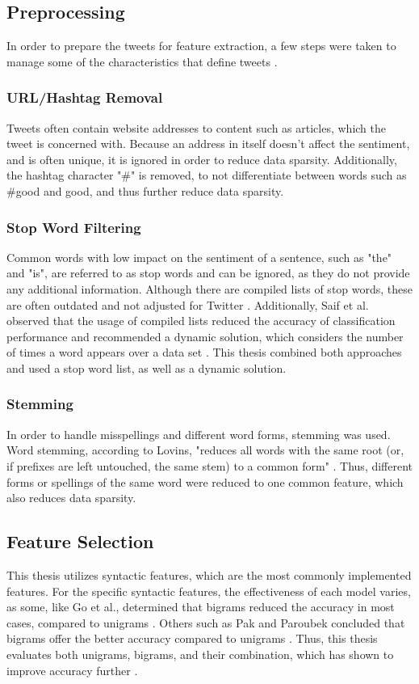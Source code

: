 \subsection{Preprocessing}
In order to prepare the tweets for feature extraction, a few steps were taken to manage some of the characteristics that define tweets \cite{DBLP:journals/csur/GiachanouC16}.

\subsubsection{URL/Hashtag Removal}
Tweets often contain website addresses to content such as articles, which the tweet is concerned with. Because an address in itself doesn't affect the sentiment, and is often unique, it is ignored in order to reduce data sparsity. Additionally, the hashtag character "\#" is removed, to not differentiate between words such as \#good and good, and thus further reduce data sparsity.

\subsubsection{Stop Word Filtering}
Common words with low impact on the sentiment of a sentence, such as "the" and "is", are referred to as stop words and can be ignored, as they do not provide any additional information. Although there are compiled lists of stop words, these are often outdated and not adjusted for Twitter \cite{DBLP:journals/csur/GiachanouC16}. Additionally, Saif et al. observed that the usage of compiled lists reduced the accuracy of classification performance and recommended a dynamic solution, which considers the number of times a word appears over a data set \cite{data_sparsity}. This thesis combined both approaches and used a stop word list, as well as a dynamic solution.

\subsubsection{Stemming}
In order to handle misspellings and different word forms, stemming was used. Word stemming, according to Lovins, "reduces all words with the same root (or, if prefixes are left
untouched, the same stem) to a common form" \cite[p.~22]{Lovins1968DevelopmentOA}. Thus, different forms or spellings of the same word were reduced to one common feature, which also reduces data sparsity.

\subsection{Feature Selection}
This thesis utilizes syntactic features, which are the most commonly implemented features. For the specific syntactic features, the effectiveness of each model varies, as some, like Go et al., determined that bigrams reduced the accuracy in most cases, compared to unigrams \cite{GoBHaHua2009}. Others such as Pak and Paroubek concluded that bigrams offer the better accuracy compared to unigrams \cite{pak}. Thus, this thesis evaluates both unigrams, bigrams, and their combination, which has shown to improve accuracy further \cite{GoBHaHua2009}.

